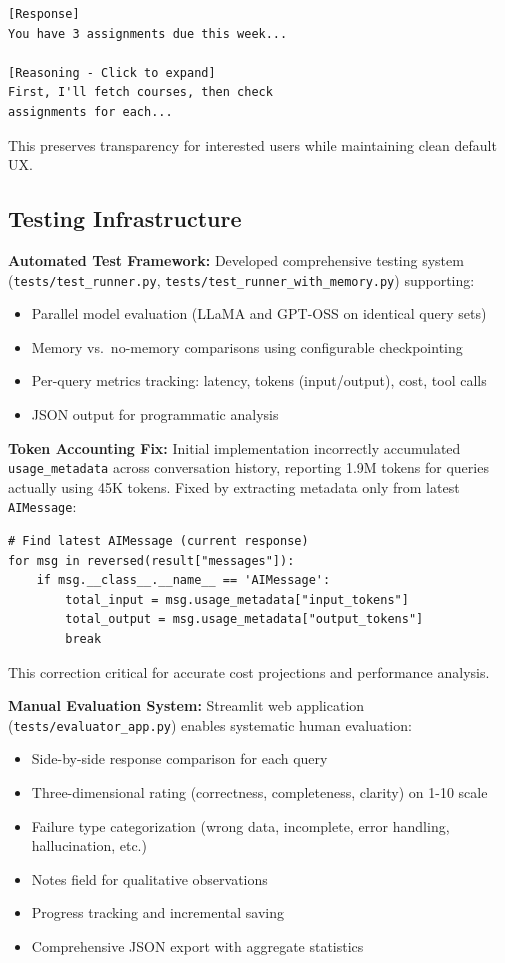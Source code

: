 \documentclass{article}
\begin{document}
\begin{verbatim}
[Response]
You have 3 assignments due this week...

[Reasoning - Click to expand]
First, I'll fetch courses, then check 
assignments for each...
\end{verbatim}

This preserves transparency for interested users while maintaining clean default UX.

\subsection{Testing Infrastructure}

\textbf{Automated Test Framework:} Developed comprehensive testing system (\texttt{tests/test\_runner.py}, \texttt{tests/test\_runner\_with\_memory.py}) supporting:

\begin{itemize}
    \item Parallel model evaluation (LLaMA and GPT-OSS on identical query sets)
    \item Memory vs.\ no-memory comparisons using configurable checkpointing
    \item Per-query metrics tracking: latency, tokens (input/output), cost, tool calls
    \item JSON output for programmatic analysis
\end{itemize}

\textbf{Token Accounting Fix:} Initial implementation incorrectly accumulated \texttt{usage\_metadata} across conversation history, reporting 1.9M tokens for queries actually using 45K tokens. Fixed by extracting metadata only from latest \texttt{AIMessage}:

\begin{verbatim}
# Find latest AIMessage (current response)
for msg in reversed(result["messages"]):
    if msg.__class__.__name__ == 'AIMessage':
        total_input = msg.usage_metadata["input_tokens"]
        total_output = msg.usage_metadata["output_tokens"]
        break
\end{verbatim}

This correction critical for accurate cost projections and performance analysis.

\textbf{Manual Evaluation System:} Streamlit web application (\texttt{tests/evaluator\_app.py}) enables systematic human evaluation:

\begin{itemize}
    \item Side-by-side response comparison for each query
    \item Three-dimensional rating (correctness, completeness, clarity) on 1-10 scale
    \item Failure type categorization (wrong data, incomplete, error handling, hallucination, etc.)
    \item Notes field for qualitative observations
    \item Progress tracking and incremental saving
    \item Comprehensive JSON export with aggregate statistics
\end{itemize}
\end{document}
